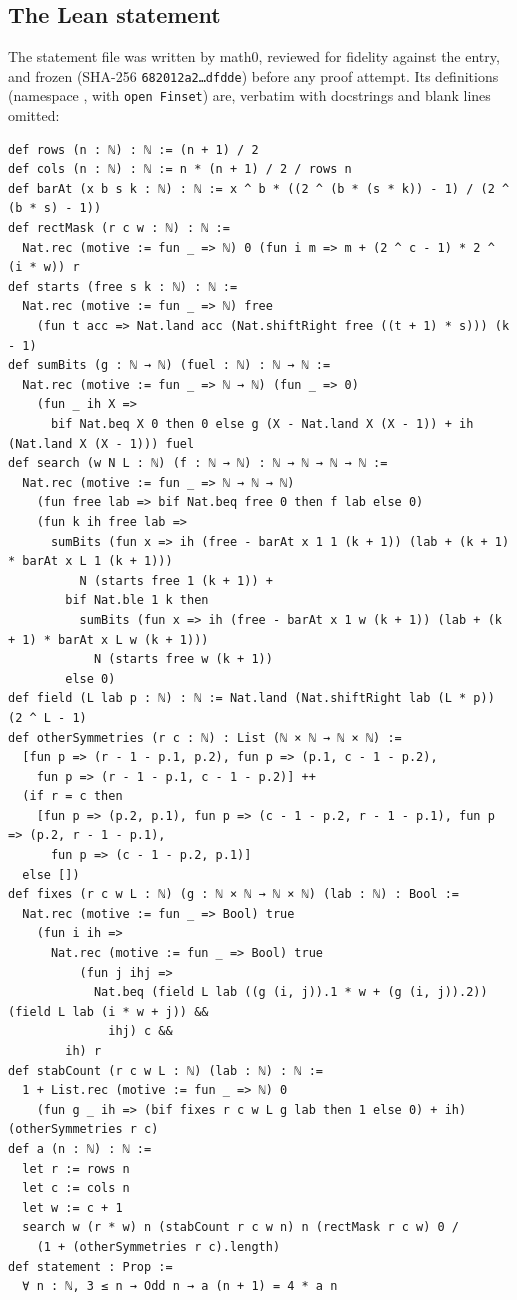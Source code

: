 \documentclass[11pt]{amsart}
\theoremstyle{plain}
\theoremstyle{definition}
\newcommand{\code}[1]{\texttt{#1}}
\begin{document}
\subsection*{The Lean statement}
The statement file  was written by math0, reviewed for fidelity against the entry, and frozen (SHA-256 \texttt{682012a2\ldots dfdde}) before any proof attempt. Its definitions (namespace , with \code{open Finset}) are, verbatim with docstrings and blank lines omitted:
\begin{lstlisting}[basicstyle=\ttfamily\fontsize{7}{7.9}\selectfont]
def rows (n : ℕ) : ℕ := (n + 1) / 2
def cols (n : ℕ) : ℕ := n * (n + 1) / 2 / rows n
def barAt (x b s k : ℕ) : ℕ := x ^ b * ((2 ^ (b * (s * k)) - 1) / (2 ^ (b * s) - 1))
def rectMask (r c w : ℕ) : ℕ :=
  Nat.rec (motive := fun _ => ℕ) 0 (fun i m => m + (2 ^ c - 1) * 2 ^ (i * w)) r
def starts (free s k : ℕ) : ℕ :=
  Nat.rec (motive := fun _ => ℕ) free
    (fun t acc => Nat.land acc (Nat.shiftRight free ((t + 1) * s))) (k - 1)
def sumBits (g : ℕ → ℕ) (fuel : ℕ) : ℕ → ℕ :=
  Nat.rec (motive := fun _ => ℕ → ℕ) (fun _ => 0)
    (fun _ ih X =>
      bif Nat.beq X 0 then 0 else g (X - Nat.land X (X - 1)) + ih (Nat.land X (X - 1))) fuel
def search (w N L : ℕ) (f : ℕ → ℕ) : ℕ → ℕ → ℕ → ℕ :=
  Nat.rec (motive := fun _ => ℕ → ℕ → ℕ)
    (fun free lab => bif Nat.beq free 0 then f lab else 0)
    (fun k ih free lab =>
      sumBits (fun x => ih (free - barAt x 1 1 (k + 1)) (lab + (k + 1) * barAt x L 1 (k + 1)))
          N (starts free 1 (k + 1)) +
        bif Nat.ble 1 k then
          sumBits (fun x => ih (free - barAt x 1 w (k + 1)) (lab + (k + 1) * barAt x L w (k + 1)))
            N (starts free w (k + 1))
        else 0)
def field (L lab p : ℕ) : ℕ := Nat.land (Nat.shiftRight lab (L * p)) (2 ^ L - 1)
def otherSymmetries (r c : ℕ) : List (ℕ × ℕ → ℕ × ℕ) :=
  [fun p => (r - 1 - p.1, p.2), fun p => (p.1, c - 1 - p.2),
    fun p => (r - 1 - p.1, c - 1 - p.2)] ++
  (if r = c then
    [fun p => (p.2, p.1), fun p => (c - 1 - p.2, r - 1 - p.1), fun p => (p.2, r - 1 - p.1),
      fun p => (c - 1 - p.2, p.1)]
  else [])
def fixes (r c w L : ℕ) (g : ℕ × ℕ → ℕ × ℕ) (lab : ℕ) : Bool :=
  Nat.rec (motive := fun _ => Bool) true
    (fun i ih =>
      Nat.rec (motive := fun _ => Bool) true
          (fun j ihj =>
            Nat.beq (field L lab ((g (i, j)).1 * w + (g (i, j)).2)) (field L lab (i * w + j)) &&
              ihj) c &&
        ih) r
def stabCount (r c w L : ℕ) (lab : ℕ) : ℕ :=
  1 + List.rec (motive := fun _ => ℕ) 0
    (fun g _ ih => (bif fixes r c w L g lab then 1 else 0) + ih) (otherSymmetries r c)
def a (n : ℕ) : ℕ :=
  let r := rows n
  let c := cols n
  let w := c + 1
  search w (r * w) n (stabCount r c w n) n (rectMask r c w) 0 /
    (1 + (otherSymmetries r c).length)
def statement : Prop :=
  ∀ n : ℕ, 3 ≤ n → Odd n → a (n + 1) = 4 * a n
\end{lstlisting}
\end{document}

